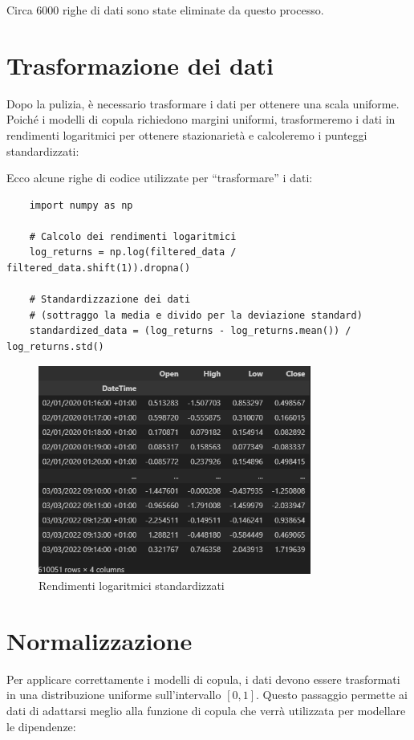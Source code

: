 \documentclass[%
	corpo=11pt,
    twoside,
    stile=classica,
    oldstyle,
    tipotesi=custom,
    greek,
    evenboxes,
]{toptesi}
\begin{document}
Circa 6000 righe di dati sono state eliminate da questo processo.
\newpage
\section{Trasformazione dei dati}

Dopo la pulizia, è necessario trasformare i dati per ottenere una scala uniforme. Poiché i modelli di copula richiedono margini uniformi, trasformeremo i dati in rendimenti logaritmici per ottenere stazionarietà e calcoleremo i punteggi standardizzati:

Ecco alcune righe di codice utilizzate per ``trasformare'' i dati:

\begin{verbatim}
	import numpy as np
	
	# Calcolo dei rendimenti logaritmici
	log_returns = np.log(filtered_data / filtered_data.shift(1)).dropna()
	
	# Standardizzazione dei dati
	# (sottraggo la media e divido per la deviazione standard)
	standardized_data = (log_returns - log_returns.mean()) / log_returns.std()
\end{verbatim}

\begin{figure}[h]
	\centering
	\includegraphics[width=0.8\textwidth]{./Pictures/dfnormal.png}
	\caption{Rendimenti logaritmici standardizzati}
	\label{fig:log_returns}
\end{figure}
\newpage
\section{Normalizzazione}

Per applicare correttamente i modelli di copula, i dati devono essere trasformati in una distribuzione uniforme sull’intervallo \([0,1]\). Questo passaggio permette ai dati di adattarsi meglio alla funzione di copula che verrà utilizzata per modellare le dipendenze:
\end{document}
